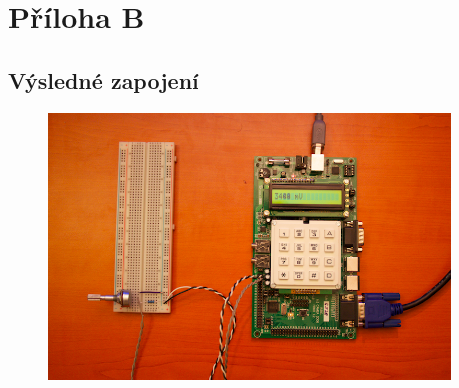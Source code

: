 \documentclass[a4paper, 11pt, titlepage]{article}
\begin{document}

\newpage
\pagestyle{empty}

\section*{Příloha B} %
\label{sec:prilohy2}

\subsection{Výsledné zapojení} %
\label{sub:vysledne_zapojeni}

\begin{figure}[htbp]
	\centering
	\includegraphics[width=0.95\textwidth]{img/a.png}
\end{figure}

\end{document}
